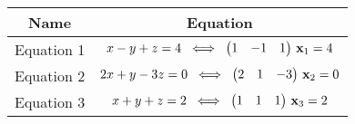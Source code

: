 \begin{tabular}{|c|c|}
\hline
\textbf{Name} & \textbf{Equation} \\
\hline
Equation 1 & $x - y + z = 4 \;\;\Longleftrightarrow\;\; \begin{pmatrix}1 & -1 & 1\end{pmatrix}\,\mathbf{x}_1 = 4$ \\ \hline
Equation 2 & $2x + y -3z = 0 \;\;\Longleftrightarrow\;\; \begin{pmatrix}2 & 1 & -3\end{pmatrix}\,\mathbf{x}_2 = 0$ \\ \hline
Equation 3 & $x + y + z = 2 \;\;\Longleftrightarrow\;\; \begin{pmatrix}1 & 1 & 1\end{pmatrix}\,\mathbf{x}_3 = 2$ \\ \hline
\end{tabular}
